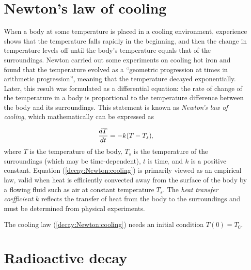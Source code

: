 \documentclass[graybox,sectrefs,envcountresetchap,open=right,final]{svmonodo}
\begin{document}
\section{Newton's law of cooling}
\label{decay:app:Newton:cooling}


When a body at some temperature is placed in a cooling environment,
experience shows that the temperature falls rapidly in the beginning,
and then the change in temperature levels off until the body's
temperature equals that of the surroundings. Newton carried out some
experiments on cooling hot iron and found that the temperature
evolved as a ``geometric progression at times in arithmetic progression'',
meaning that the temperature decayed exponentially.
Later, this result was formulated as a differential equation:
the rate of change of the temperature in a body is proportional to
the temperature difference between the body and its surroundings.
This statement is known as \emph{Newton's law of cooling}, which
mathematically can be expressed as

\begin{equation}
{dT\over dt} = -k(T-T_s),
\label{decay:Newton:cooling}
\end{equation}
where $T$ is the temperature of the body, $T_s$ is the temperature
of the surroundings (which may be time-dependent),
$t$ is time, and $k$ is a positive constant.
Equation (\ref{decay:Newton:cooling}) is primarily viewed as an
empirical law, valid when heat is efficiently convected away
from the surface of the body by a flowing fluid such as air
at constant temperature $T_s$.
The \emph{heat transfer coefficient} $k$ reflects the transfer of
heat from the body to
the surroundings and must be determined from physical experiments.

The cooling law (\ref{decay:Newton:cooling}) needs an initial
condition $T(0)=T_0$.


\section{Radioactive decay}
\label{decay:app:nuclear}
\end{document}
